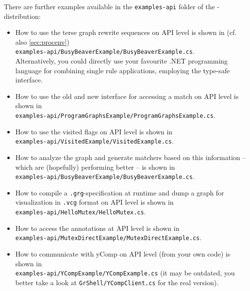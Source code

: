 There are further examples available in the \texttt{examples-api} folder of the \GrG-distribution:
\begin{itemize} 
\item How to use the terse graph rewrite sequences on API level is shown in (cf. also \ref{sec:procenv})\\
\texttt{examples-api/BusyBeaverExample/BusyBeaverExample.cs}.\\
Alternatively, you could directly use your favourite .NET programming language for combining single rule applications, employing the type-safe interface.
\item How to use the old and new interface for accessing a match on API level is shown in\\
\texttt{examples-api/ProgramGraphsExample/ProgramGraphsExample.cs}.
\item How to use the visited\label{apiallocvisitflag} flags on API level is shown in\\
\texttt{examples-api/VisitedExample/VisitedExample.cs}.
\item How to analyze the graph and generate matchers based on this information -- which are (hopefully) performing better -- is shown in\\
\texttt{examples-api/BusyBeaverExample/BusyBeaverExample.cs}.
\item How to compile a \texttt{.grg}-specification at runtime and dump a graph for visualization in \texttt{.vcg} format on API level is shown in\\
\texttt{examples-api/HelloMutex/HelloMutex.cs}.
\item How to access the annotations at API level is shown in\\
\texttt{examples-api/MutexDirectExample/MutexDirectExample.cs}.
\item How to communicate with yComp on API level (from your own code) is shown in\\
\texttt{examples-api/YCompExample/YCompExample.cs} (it may be outdated, you better take a look at \texttt{GrShell/YCompClient.cs} for the real version).
\end{itemize}

